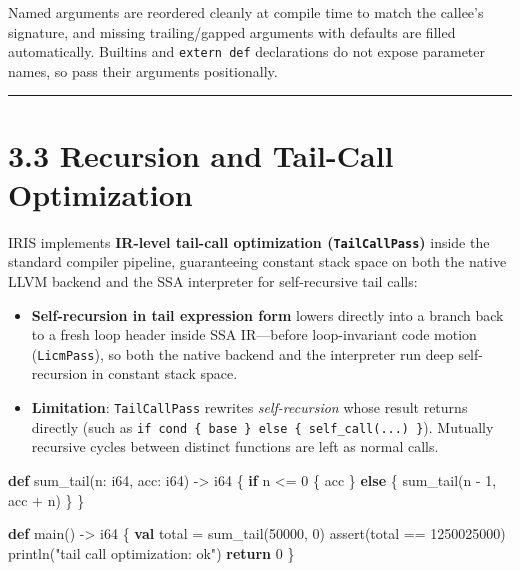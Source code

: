 \documentclass[
  english,
  oneside]{book}
\newenvironment{Shaded}{\begin{snugshade}}{\end{snugshade}}
\newcommand{\ControlFlowTok}[1]{\textcolor[rgb]{0.77,0.53,0.75}{\textbf{#1}}}
\newcommand{\DataTypeTok}[1]{\textcolor[rgb]{0.31,0.79,0.69}{#1}}
\newcommand{\DecValTok}[1]{\textcolor[rgb]{0.71,0.81,0.66}{#1}}
\newcommand{\FunctionTok}[1]{\textcolor[rgb]{0.86,0.86,0.67}{#1}}
\newcommand{\KeywordTok}[1]{\textcolor[rgb]{0.34,0.61,0.84}{\textbf{#1}}}
\newcommand{\NormalTok}[1]{\textcolor[rgb]{0.83,0.83,0.83}{#1}}
\newcommand{\OperatorTok}[1]{\textcolor[rgb]{0.83,0.83,0.83}{#1}}
\newcommand{\StringTok}[1]{\textcolor[rgb]{0.81,0.57,0.47}{#1}}
\providecommand{\tightlist}{%
  \setlength{\itemsep}{0pt}\setlength{\parskip}{0pt}}
\begin{document}
Named arguments are reordered cleanly at compile time to match the
callee's signature, and missing trailing/gapped arguments with defaults
are filled automatically. Builtins and \texttt{extern\ def} declarations
do not expose parameter names, so pass their arguments positionally.

\begin{center}\rule{0.5\linewidth}{0.5pt}\end{center}

\section{3.3 Recursion and Tail-Call
Optimization}\label{recursion-and-tail-call-optimization}

IRIS implements \textbf{IR-level tail-call optimization
(\texttt{TailCallPass})} inside the standard compiler pipeline,
guaranteeing constant stack space on both the native LLVM backend and
the SSA interpreter for self-recursive tail calls:

\begin{itemize}
\tightlist
\item
  \textbf{Self-recursion in tail expression form} lowers directly into a
  branch back to a fresh loop header inside SSA IR---before
  loop-invariant code motion (\texttt{LicmPass}), so both the native
  backend and the interpreter run deep self-recursion in constant stack
  space.
\item
  \textbf{Limitation}: \texttt{TailCallPass} rewrites
  \emph{self-recursion} whose result returns directly (such as
  \texttt{if\ cond\ \{\ base\ \}\ else\ \{\ self\_call(...)\ \}}).
  Mutually recursive cycles between distinct functions are left as
  normal calls.
\end{itemize}

\begin{Shaded}
\begin{Highlighting}[]
\KeywordTok{def}\NormalTok{ sum\_tail(n: }\DataTypeTok{i64}\NormalTok{, acc: }\DataTypeTok{i64}\NormalTok{) }\OperatorTok{{-}\textgreater{}} \DataTypeTok{i64}\NormalTok{ \{}
    \ControlFlowTok{if}\NormalTok{ n }\OperatorTok{\textless{}=} \DecValTok{0}\NormalTok{ \{}
\NormalTok{        acc}
\NormalTok{    \} }\ControlFlowTok{else}\NormalTok{ \{}
\NormalTok{        sum\_tail(n }\OperatorTok{{-}} \DecValTok{1}\NormalTok{, acc }\OperatorTok{+}\NormalTok{ n)}
\NormalTok{    \}}
\NormalTok{\}}

\KeywordTok{def}\NormalTok{ main() }\OperatorTok{{-}\textgreater{}} \DataTypeTok{i64}\NormalTok{ \{}
    \KeywordTok{val}\NormalTok{ total }\OperatorTok{=}\NormalTok{ sum\_tail(}\DecValTok{50000}\NormalTok{, }\DecValTok{0}\NormalTok{)}
    \FunctionTok{assert}\NormalTok{(total }\OperatorTok{==} \DecValTok{1250025000}\NormalTok{)}
\NormalTok{    println(}\StringTok{"tail call optimization: ok"}\NormalTok{)}
    \ControlFlowTok{return} \DecValTok{0}
\NormalTok{\}}
\end{Highlighting}
\end{Shaded}
\end{document}

